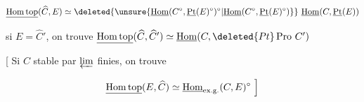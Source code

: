 \[\underline{\mathrm{Hom\,top}}(\widehat C,E)\simeq\deleted{\unsure{\underline{\mathrm{Hom}}(C^\circ,\underline{\mathrm{Pt}}(E)^\circ)^\circ|\underline{\mathrm{Hom}}(C^\circ,\underline{\mathrm{Pt}}(E)^\circ)}}\ \underline{\mathrm{Hom}}(C,\underline{\mathrm{Pt}}(E))\]

si $E=\widehat C'$, on trouve $\underline{\mathrm{Hom\,top}}(\widehat C,\widehat C')\simeq\underline{\mathrm{Hom}}(C,\deleted{Pt}\operatorname{Pro}\,C')$ 

[ Si $C$ stable par $\varprojlim$ finies, on trouve

\[\underline{\mathrm{Hom\,top}}(E,\widehat C)\simeq\underline{\mathrm{Hom}}_{\mathrm{ex.g.}}(C,E)^\circ\ \Bigr]\vphantom{\widehat C}\]
